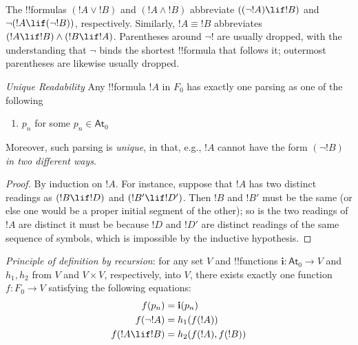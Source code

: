 \documentclass[../../include/open-logic-section]{subfiles}
\begin{document}
\begin{explain}
 The !!{formula}s $(!A \lor !B)$ and $(!A \land !B)$
 abbreviate $((\lnot !A) \lif !B)$ and $\lnot(!A
 \lif (\lnot !B))$, respectively. Similarly, $!A \equiv
 !B$ abbreviates $(!A \lif !B) \land (!B \lif
 !A)$. Parentheses around $\lnot
 !$ are usually dropped, with the understanding that $\lnot$
 binds the shortest !!{formula} that follows it; outermost parentheses are
 likewise usually dropped.
 \end{explain}
 
\begin{prop}
\emph{Unique Readability} Any !!{formula}
  $!A$ in $ F_0$ has exactly one  parsing as one
  of the following
  \begin{enumerate}
  \item $p_n$ for some $p_n \in  \mathsf{At}_0$
  \end{enumerate}
  Moreover, such parsing is \emph{unique}, in that, e.g., $!A$
  cannot have the form $(\lnot !B)$ \emph{ in two different ways}.
\end{prop}

\begin{proof}
By induction on $!A$. For instance, suppose that $!A$ has
two distinct readings as $(!B \lif !D)$ and $(!B' \lif
!D')$. Then $!B$ and $!B'$ must be the same (or else one would
be a proper initial segment of the other); so is the two readings of
$!A$ are distinct it must be because $!D$ and $!D'$ are
distinct readings of the same sequence of symbols, which is impossible
by the inductive hypothesis. 
\end{proof}

 \begin{thm}  
 \emph{Principle of definition by
     recursion}: for any set $V$ and !!{function}s $\mathbf{i} :
   \mathsf{At}_0 \to V$ and $h_1, h_2$ from $V$ and $V \times V$,
   respectively, into $V$, there exists exactly one function $f :
   F_0 \to V$ satisfying the following equations:
  \begin{align*}
    f(p_n) &= \mathbf{i}(p_n) \\
    f(\lnot !A) &= h_1(f(!A))\\
    f(!A \lif !B) &= h_2(f(!A),f(!B))
  \end{align*}
\end{thm}
\end{document}
